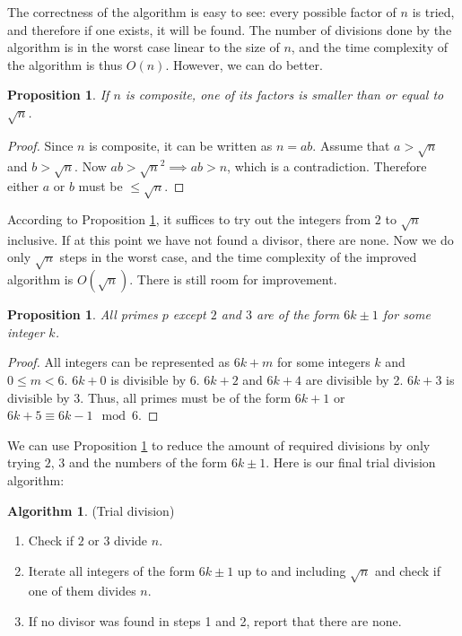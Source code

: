 \documentclass[12pt] {article}
\theoremstyle{plain}
\newtheorem{prop}[thm]{Proposition}
\theoremstyle{definition}
\newtheorem{algo}[thm]{Algorithm}
\begin{document}
The correctness of the algorithm is easy to see: every possible factor of $n$ is tried, and therefore if one exists, it will be found. The number of divisions done by the algorithm is in the worst case linear to the size of $n$, and the time complexity of the algorithm is thus $O(n)$. However, we can do better.

\begin{prop}
\label {prop:factupperbound}
If $n$ is composite, one of its factors is smaller than or equal to $\sqrt{n}$.
\end{prop}

\begin{proof}
Since $n$ is composite, it can be written as $n = ab$. Assume that $a > \sqrt{n}$ and $b > \sqrt{n}$. Now $ab > \sqrt{n}^2 \implies ab > n$, which is a contradiction. Therefore either $a$ or $b$ must be $\leq \sqrt{n}$.
\end{proof}

According to Proposition \ref{prop:factupperbound}, it suffices to try out the integers from $2$ to $\sqrt{n}$ inclusive. If at this point we have not found a divisor, there are none. Now we do only $\sqrt{n}$ steps in the worst case, and the time complexity of the improved algorithm is $O(\sqrt{n})$. There is still room for improvement.

\begin{prop}
\label {prop:primes6pm1}
All primes $p$ except $2$ and $3$ are of the form $6k \pm 1$ for some integer $k$.
\end{prop}

\begin{proof}
All integers can be represented as $6k + m$ for some integers $k$ and $0 \leq m < 6$. $6k + 0$ is divisible by 6. $6k + 2$ and $6k + 4$ are divisible by 2. $6k + 3$ is divisible by 3. Thus, all primes must be of the form $6k + 1$ or $6k + 5 \equiv 6k - 1 \mod 6$.
\end{proof}

We can use Proposition \ref{prop:primes6pm1} to reduce the amount of required divisions by only trying $2$, $3$ and the numbers of the form $6k \pm 1$. Here is our final trial division algorithm:
\begin{algo} (Trial division)
\begin{enumerate}
\item Check if $2$ or $3$ divide $n$.
\item Iterate all integers of the form $6k \pm 1$ up to and including $\sqrt{n}$ and check if one of them divides $n$.
\item If no divisor was found in steps 1 and 2, report that there are none.
\end{enumerate}
\end{algo}
\end{document}
